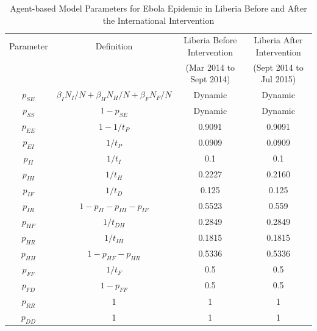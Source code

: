 \begin{table}[h!]
\caption{Agent-based Model Parameters for Ebola Epidemic in Liberia Before and After the International Intervention} %
\centering %
\begin{tabular}{c c c c} 
\hline\hline %
Parameter & Definition&  Liberia Before Intervention  & Liberia After Intervention \\ %
& & (Mar 2014 to Sept 2014) &  (Sept 2014 to Jul 2015) \\ %
\hline %
$p_{SE}$	 &$\beta_I N_{I}/N+\beta_H N_{H}/N+\beta_F  N_F/ N$ 	& Dynamic	 & Dynamic \\ 
$p_{SS}$ 	& $1-p_{SE}$													 & Dynamic & Dynamic  \\ 
$p_{EE}$ 	& $1-1/t_{P}$ 												& 0.9091 			& 0.9091  \\ 
$p_{EI}$ 	& $1/t_{P}$ 												&0.0909			 & 0.0909  \\ 
$p_{II}$ 	& $1/t_{I}$ 												& 0.1 				& 0.1  \\ 
$p_{IH}$	 & $1/t_{H}$ 												&0.2227 			& 0.2160  \\ 
$p_{IF}$ 	& $1/t_{D}$ 												& 0.125 			& 0.125  \\ 
$p_{IR}$ 	& $1-p_{II}-p_{IH}-p_{IF}$ 											&0.5523 			& 0.559  \\ 
$p_{HF}$ 	& $1/t_{DH}$												& 0.2849 			& 0.2849 \\ 
$p_{HR}$ 	& $1/t_{IH}$ 												&0.1815 			& 0.1815 \\ 
$p_{HH}$ 	& $1-p_{HF}-p_{HR}$ 												& 0.5336			& 0.5336  \\ 
$p_{FF}$ 	& $1/t_{F}$ 												&  0.5 			& 0.5 \\ 
$p_{FD}$ 	& $1-p_{FF}$													 & 0.5 			& 0.5  \\ 
$p_{RR}$ 	& 1															& 1 				& 1  \\ 
$p_{DD}$ 	& 1															&1				 & 1 \\ [1ex] 
\hline 
\end{tabular}
\label{tab:probabilities}
\end{table}
